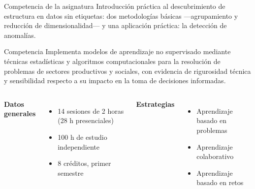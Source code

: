 \documentclass[aspectratio=169,11pt]{beamer}
\begin{document}
\begin{frame}{Competencia de la asignatura}
  {\small Introducción práctica al descubrimiento de estructura en datos sin etiquetas:
  dos metodologías básicas ---agrupamiento y reducción de dimensionalidad--- y una
  aplicación práctica: la detección de anomalías.}
  \vspace{2pt}
  \begin{block}{Competencia}
    Implementa modelos de aprendizaje no supervisado mediante técnicas estadísticas y
    algoritmos computacionales para la resolución de problemas de sectores productivos
    y sociales, con evidencia de rigurosidad técnica y sensibilidad respecto a su
    impacto en la toma de decisiones informadas.
  \end{block}
  \vspace{4pt}
  \begin{columns}[T]
    \textbf{Datos generales}
    \begin{itemize}
      \item 14 sesiones de 2 horas (28 h presenciales)
      \item 100 h de estudio independiente
      \item 8 créditos, primer semestre
    \end{itemize}
    \textbf{Estrategias}
    \begin{itemize}
      \item Aprendizaje basado en problemas
      \item Aprendizaje colaborativo
      \item Aprendizaje basado en retos
    \end{itemize}
  \end{columns}
\end{frame}
\end{document}
